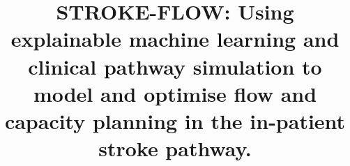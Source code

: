 
\title{STROKE-FLOW: Using explainable machine learning and clinical pathway simulation to model and optimise flow and capacity planning in the in-patient stroke pathway.}

\author{} %
\date{} %